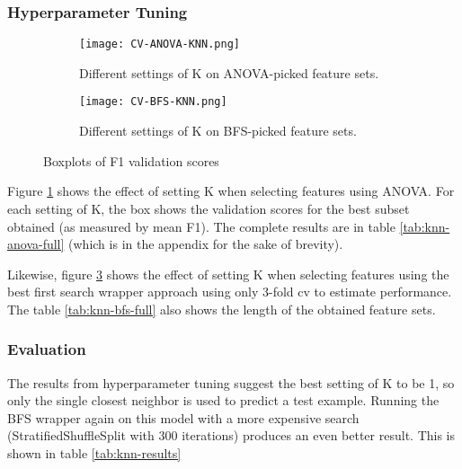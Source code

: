 \documentclass{article}
\begin{document}
\subsubsection{Hyperparameter Tuning}

\begin{figure}[H]
    \centering
    \begin{subfigure}[t]{0.49\linewidth}
        \texttt{[image: CV-ANOVA-KNN.png]}
        \caption{Different settings of K on ANOVA-picked feature sets.}%
        \label{fig:knn-anova-k}
    \end{subfigure}
    \centering
    \begin{subfigure}[t]{0.49\linewidth}
        \texttt{[image: CV-BFS-KNN.png]}
        \caption{Different settings of K on BFS-picked feature sets.}
        \label{fig:knn-bfs}
    \end{subfigure} 
    \caption{Boxplots of F1 validation scores}
\end{figure}


Figure \ref{fig:knn-anova-k} shows the effect of setting K when selecting features using ANOVA. For each setting of K, the box shows the validation scores for the best subset obtained (as measured by mean F1). The complete results are in table \ref{tab:knn-anova-full} (which is in the appendix for the sake of brevity).

Likewise, figure \ref{fig:knn-bfs} shows the effect of setting K when selecting features using the best first search wrapper approach using only 3-fold cv to estimate performance. The table \ref{tab:knn-bfs-full} also shows the length of the obtained feature sets.

\subsubsection{Evaluation}

The results from hyperparameter tuning suggest the best setting of K to be 1, so only the single closest neighbor is used to predict a test example. Running the BFS wrapper again on this model with a more expensive search (StratifiedShuffleSplit with 300 iterations) produces an even better result. This is shown in table \ref{tab:knn-results}
\end{document}
